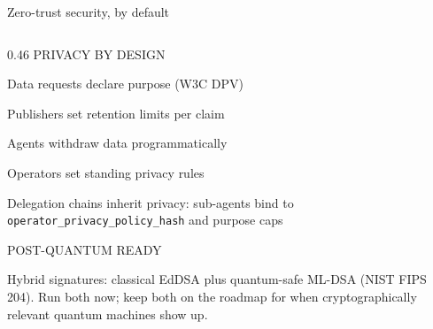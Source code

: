 \documentclass[aspectratio=169,10pt]{beamer}
\newcommand{\cmark}{\textcolor{mint}{\ding{51}}}
\begin{document}
\begin{frame}[shrink=5]{Zero-trust security, by default}
\begin{columns}[T]
\begin{column}{0.46\textwidth}
{\footnotesize\color{accent} PRIVACY BY DESIGN}\par
\vspace{4pt}
{\footnotesize\color{txtm}%
\cmark\; Data requests declare purpose (W3C DPV)\par
\vspace{2pt}
\cmark\; Publishers set retention limits per claim\par
\vspace{2pt}
\cmark\; Agents withdraw data programmatically\par
\vspace{2pt}
\cmark\; Operators set standing privacy rules\par
\vspace{2pt}
\cmark\; Delegation chains inherit privacy: sub-agents bind to \texttt{operator\_privacy\_policy\_hash} and purpose caps\par
}
\vspace{6pt}
{\footnotesize\color{cyan} POST-QUANTUM READY}\par
\vspace{2pt}
{\footnotesize\color{txtm}%
Hybrid signatures: classical EdDSA plus quantum-safe ML-DSA (NIST FIPS 204). Run both now; keep both on the roadmap for when cryptographically relevant quantum machines show up.%
}
\end{column}
\end{columns}
\end{frame}
\end{document}
